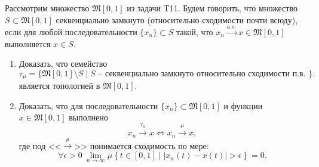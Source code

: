 \begin{task}[T12]
    Рассмотрим множество $\mathfrak{M}[0, 1]$ из задачи T11. Будем говорить, что множество $S \subset \mathfrak{M}[0, 1]$ секвенциально замкнуто (относительно сходимости почти всюду), если для любой последовательности $\{x_n\} \subset S$ такой, что $x_n \xrightarrow{a.s.} x \in \mathfrak{M}[0, 1]$ выполняется $x \in S$.
    \begin{enumerate}
        \item Доказать, что семейство
        \[
            \tau_\mu = \{\mathfrak{M}[0, 1] \setminus S \mid S \text{ -- секвенциально замкнуто относительно сходимости п.в. }\}.
        \]
        является топологией в $\mathfrak{M}[0, 1]$.
        \item Доказать, что для последовательности $\{x_n\} \subset \mathfrak{M}[0, 1]$ и функции $x \in \mathfrak{M}[0, 1]$ выполнено
        \[
            x_n \xrightarrow{\tau_\mu} x \Longleftrightarrow x_n \xrightarrow{\mu} x,
        \]
        где под <<$\xrightarrow{\mu}$>> понимается сходимость по мере:
        \[
            \forall \epsilon > 0 \ \lim\limits_{n \rightarrow \infty} \mu\left\{t \in [0, 1] \mid |x_n(t) - x(t)| > \epsilon\right\} = 0.
        \]
    \end{enumerate}
\end{task}
